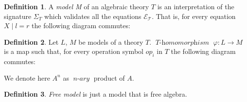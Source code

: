 \documentclass[declaration,shortabstract]{iithesis}
\theoremstyle{definition} \newtheorem{definition}{Definition}[chapter]
\theoremstyle{remark} \newtheorem{remark}[definition]{Observation}
\theoremstyle{plain} \newtheorem{theorem}[definition]{Theorem}
\theoremstyle{plain} \newtheorem{lemma}[definition]{Lemma}
\newcommand{\mathVar}[1]{{\operatorname{\mathit{#1}}}}
\begin{document}
    \begin{definition}

    A \textit{model M} of an algebraic theory $T$ is an interpretation of the
    signature ${\Sigma_{T}}$ which validates all the equations $\mathcal{E_{T}}$.
    That is, for every equation $X \mid l = r$ the following diagram commutes:

    \begin{center}
    \end{center}

    \end{definition}

    \begin{definition}

    Let $L$, $M$ be models of a theory $T$. $ \mathVar{T-homomorphism}$
    $\varphi : L \rightarrow M$ is a map such that, for every operation symbol
    $op_{i}$ in $T$ the following diagram commutes:

    \begin{center}
    \end{center}

    \noindent
    We denote here $A^{n}$ as $\mathVar{n-ary}$ product of $A$.

    \end{definition}


    \begin{definition} \textit{Free model} is just a model that is free algebra.
    \end{definition}
\end{document}
